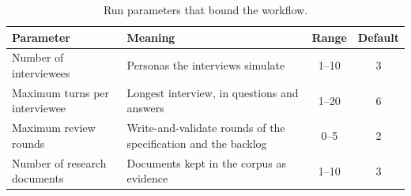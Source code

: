\begin{table}[H]
    \centering
    \caption{Run parameters that bound the workflow.}
    \label{tab:pa-run-parameters}
    \begin{tabularx}{\linewidth}{|l|X|c|c|}
        \hline
        \textbf{Parameter} & \textbf{Meaning} & \textbf{Range} & \textbf{Default} \\
        \hline
        Number of interviewees & Personas the interviews simulate & 1--10 & 3 \\
        Maximum turns per interviewee & Longest interview, in questions and answers & 1--20 & 6 \\
        Maximum review rounds & Write-and-validate rounds of the specification and the backlog & 0--5 & 2 \\
        Number of research documents & Documents kept in the corpus as evidence & 1--10 & 3 \\
        \hline
    \end{tabularx}
\end{table}
